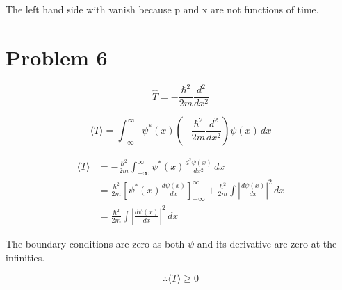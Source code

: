 \documentclass[12pt]{article}
\begin{document}
The left hand side with vanish because p and x are not functions of time.

\newpage
\section{Problem 6}

\[
    \hat{T} = -\frac{\hbar^2}{2m} \frac{d^2}{dx^2}
\]

\[
    \langle T \rangle = \int_{-\infty}^{\infty} \psi^*(x) \left( -\frac{\hbar^2}{2m} \frac{d^2}{dx^2} \right) \psi(x) \, dx
\]

\begin{equation*}
    \begin{split}
        \langle T \rangle & = -\frac{\hbar^2}{2m} \int_{-\infty}^{\infty} \psi^*(x) \frac{d^2 \psi(x)}{dx^2} \, dx                                                                  \\
                          & =\frac{\hbar^2}{2m}\left[\psi^*(x) \frac{d \psi(x)}{dx}\right]_{-\infty}^{\infty} + \frac{\hbar^2}{2m} \int \left| \frac{d \psi(x)}{dx} \right|^2 \, dx \\
                          & =\frac{\hbar^2}{2m} \int \left| \frac{d \psi(x)}{dx} \right|^2 \, dx
    \end{split}
\end{equation*}

The boundary conditions are zero as both $\psi$ and its derivative are zero at the infinities.

\[
    \therefore \langle T \rangle \geq 0
\]

\newpage
\end{document}
